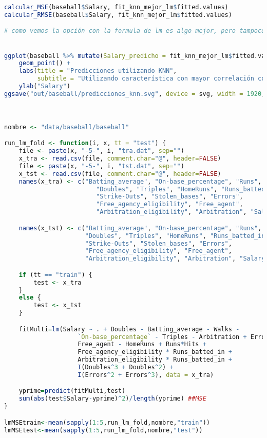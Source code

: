 \begin{lstlisting}[language=R]
calcular_MSE(baseball$Salary, fit_knn_mejor_lm$fitted.values)
calcular_RMSE(baseball$Salary, fit_knn_mejor_lm$fitted.values)

# como vemos la opción con la formula de lm es algo mejor, pero tampoco mucho


ggplot(baseball %>% mutate(Salary_predicho = fit_knn_mejor_lm$fitted.values) %>% pivot_longer(Salary:Salary_predicho), aes(x = Runs_batted_in, y = value, color = name)) +
	geom_point() +
	labs(title = "Predicciones utilizando KNN",
		 subtitle = "Utilizando característica con mayor correlación con el salario.") +
	ylab("Salary")
ggsave("out/baseball/predicciones_knn.svg", device = svg, width = 1920, height = 1080, units = "px", dpi = 150)



nombre <- "data/baseball/baseball"

run_lm_fold <- function(i, x, tt = "test") {
	file <- paste(x, "-5-", i, "tra.dat", sep="")
	x_tra <- read.csv(file, comment.char="@", header=FALSE)
	file <- paste(x, "-5-", i, "tst.dat", sep="")
	x_tst <- read.csv(file, comment.char="@", header=FALSE)
	names(x_tra) <- c("Batting_average", "On-base_percentage", "Runs", "Hits",
						 "Doubles", "Triples", "HomeRuns", "Runs_batted_in", "Walks",
						 "Strike-Outs", "Stolen_bases", "Errors",
						 "Free_agency_eligibility", "Free_agent",
						 "Arbitration_eligibility", "Arbitration", "Salary")

	names(x_tst) <- c("Batting_average", "On-base_percentage", "Runs", "Hits",
					  "Doubles", "Triples", "HomeRuns", "Runs_batted_in", "Walks",
					  "Strike-Outs", "Stolen_bases", "Errors",
					  "Free_agency_eligibility", "Free_agent",
					  "Arbitration_eligibility", "Arbitration", "Salary")

	if (tt == "train") {
		test <- x_tra
	}
	else {
		test <- x_tst
	}

	fitMulti=lm(Salary ~ . + Doubles - Batting_average - Walks -
					`On-base_percentage` - Triples - Arbitration + Errors -
					Free_agent - HomeRuns + Runs*Hits +
					Free_agency_eligibility * Runs_batted_in +
					Arbitration_eligibility * Runs_batted_in +
					I(Doubles^3 + Doubles^2) +
					I(Errors^2 + Errors^3), data = x_tra)

	yprime=predict(fitMulti,test)
	sum(abs(test$Salary-yprime)^2)/length(yprime) ##MSE
}

lmMSEtrain<-mean(sapply(1:5,run_lm_fold,nombre,"train"))
lmMSEtest<-mean(sapply(1:5,run_lm_fold,nombre,"test"))




\end{lstlisting}
